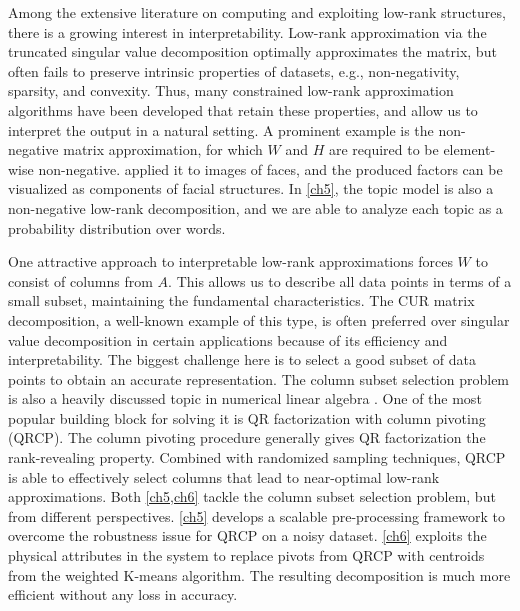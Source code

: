Among the extensive literature on computing and exploiting low\hyp{}rank
structures, there is a growing interest in interpretability. Low\hyp{}rank
approximation via the truncated singular value decomposition optimally
approximates the matrix, but often fails to preserve intrinsic properties of
datasets, e.g., non\hyp{}negativity, sparsity, and convexity. Thus, many
constrained low\hyp{}rank approximation algorithms have been developed that
retain these properties, and allow us to interpret the output in a natural
setting. A prominent example is the non\hyp{}negative matrix approximation, for
which $W$ and $H$ are required to be element\hyp{}wise non\hyp{}negative. 
\citet{lee1999learning} applied it to images of faces, and the produced factors
can be visualized as components of facial structures. In \cref{ch5}, the topic
model is also a non\hyp{}negative low\hyp{}rank decomposition, and we are able
to analyze each topic as a probability distribution over words.

One attractive approach to interpretable low\hyp{}rank approximations
forces $W$ to consist of columns from $A$. This allows us to describe all data
points in terms of a small subset, maintaining the fundamental characteristics.
The CUR matrix decomposition, a well\hyp{}known example of this type, is often
preferred over singular value decomposition in certain applications because of
its efficiency and interpretability. The biggest challenge here is to select a
good subset of data points to obtain an accurate representation. The column
subset selection problem is also a heavily discussed topic in numerical linear
algebra \cite{boutsidis2009improved,deshpande2010efficient}. One of the most
popular building block for solving it is QR factorization with column pivoting 
(QRCP). The column pivoting procedure generally gives QR factorization the 
rank\hyp{}revealing property. Combined with randomized sampling techniques, QRCP
is able to effectively select columns that lead to near\hyp{}optimal 
low\hyp{}rank approximations. Both \cref{ch5,ch6} tackle the column subset
selection problem, but from different perspectives. \cref{ch5} develops a
scalable pre\hyp{}processing framework to overcome the robustness issue for
QRCP on a noisy dataset. \cref{ch6} exploits the physical attributes in the
system to replace pivots from QRCP with centroids from the weighted K\hyp{}means
algorithm. The resulting decomposition is much more efficient without any loss
in accuracy.